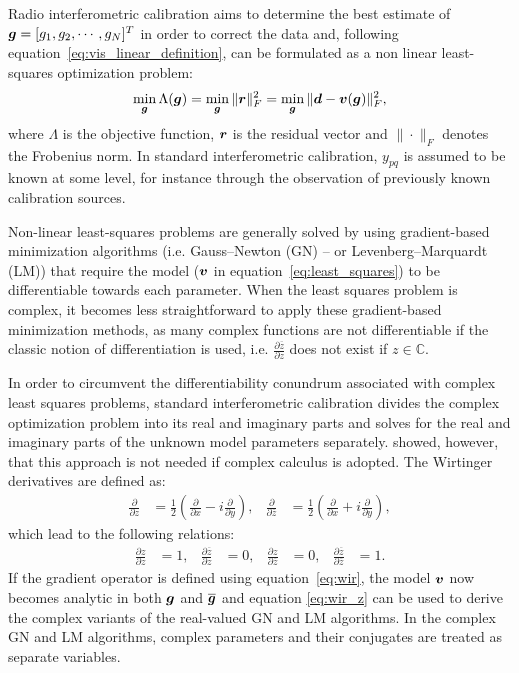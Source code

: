 \documentclass[useAMS,usenatbib]{mn2e}
\newcommand{\br}{\bmath{r}}
\newcommand{\bg}{\bmath{g}}
\newcommand{\bd}{\bmath{d}}
\newcommand{\bv}{\bmath{v}}
\newcommand{\conj}[1]{\overline{#1}}
\begin{document}
Radio interferometric calibration aims to determine the best estimate of $\bg = [g_1,g_2,\cdots,g_N]^T$ in order to correct the data and, following equation~\ref{eq:vis_linear_definition}, can be formulated as a non linear least-squares optimization problem:
\begin{equation}
\label{eq:least_squares}
\min_{\bg} \Lambda(\bg) = \min_{\bg} \|\br\|_F^2 = \min_{\bg} \|\bd - \bv(\bg)\|_F^2, 
\end{equation}
where $\Lambda$ is the objective function, $\br$ is the residual vector and $\|\cdot\|_F$ denotes the Frobenius norm. In standard interferometric calibration, $y_{pq}$ is assumed to be known at some level, for instance through the observation of previously known calibration sources. 

Non-linear least-squares problems are generally solved by using gradient-based minimization algorithms (i.e. Gauss--Newton (GN) -- or Levenberg--Marquardt (LM)) that require the model ($\bv$ in equation~\ref{eq:least_squares}) to be differentiable towards each parameter. 
When the least squares problem is complex, it becomes less straightforward to apply these gradient-based minimization methods, as
many complex functions are not differentiable if the classic notion of differentiation is used, i.e. $\frac{\partial \conj{z}}{\partial z}$ does not exist if $z \in \mathbb{C}$.

In order to circumvent the differentiability conundrum associated with complex least squares problems, standard interferometric calibration divides the complex optimization problem into its real and imaginary parts and solves for the real and imaginary parts of the unknown model parameters separately. \citet{Smirnov2015} showed, however, that this approach is not needed if complex calculus \citep{Wirtinger1927} is adopted. The Wirtinger derivatives are defined as:
\begin{align}
\label{eq:wir}
\frac{\partial}{\partial z} &= \frac{1}{2}\left ( \frac{\partial}{\partial x} -  i \frac{\partial}{\partial y} \right ),&\frac{\partial}{\partial \conj{z}} &= \frac{1}{2}\left ( \frac{\partial}{\partial x} +  i \frac{\partial}{\partial y} \right ), 
\end{align}
which lead to the following relations:
\begin{align}
\label{eq:wir_z}
\frac{\partial z}{\partial z} & = 1, & \frac{\partial \conj{z}}{\partial z}&=0, & \frac{\partial z}{\partial \conj{z}} & = 0, & \frac{\partial \conj{z}}{\partial \conj{z}}&=1.
\end{align}
If the gradient operator is defined using equation~\ref{eq:wir}, the model $\bv$ now becomes analytic in both $\bg$ and $\conj{\bg}$ and equation \ref{eq:wir_z} can be used to derive the complex variants of the real-valued GN and LM algorithms. In the complex GN and LM algorithms, complex parameters and their conjugates are treated as separate variables.
\end{document}
